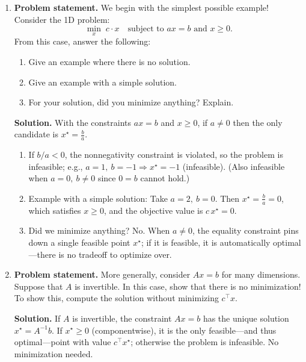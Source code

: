\documentclass[11pt]{article}
\begin{document}
	\begin{enumerate}[label=\textbf{1(\alph*)}]
		
		\item \textbf{Problem statement.}
		We begin with the simplest possible example! Consider the 1D problem:
		\begin{equation}
			\min_{x}\; c \cdot x
			\quad \text{subject to } a x = b \text{ and } x \ge 0.
			\label{eq:1d}
		\end{equation}
		From this case, answer the following:
		\begin{enumerate}[label=\roman*)]
			\item Give an example where there is no solution.
			\item Give an example with a simple solution.
			\item For your solution, did you minimize anything? Explain.
		\end{enumerate}
		
		\textbf{Solution.}
		With the constraints \(ax=b\) and \(x\ge 0\), if \(a\neq 0\) then the only candidate is
		\(x^\star=\tfrac{b}{a}\).
		\begin{enumerate}[label=\roman*)]
			\item If \(b/a<0\), the nonnegativity constraint is violated, so the problem is infeasible; e.g.,
			\(a=1,\ b=-1 \Rightarrow x^\star=-1\) (infeasible).
			(Also infeasible when \(a=0,\ b\neq 0\) since \(0=b\) cannot hold.)
			\item Example with a simple solution: Take \(a=2,\ b=0\). Then \(x^\star=\tfrac{b}{a}=0\), which satisfies \(x\ge 0\), and the objective value is \(c\,x^\star=0\).
			\item Did we minimize anything? No. When \(a\neq 0\), the equality constraint pins down a single feasible point \(x^\star\);
			if it is feasible, it is automatically optimal—there is no tradeoff to optimize over.
		\end{enumerate}
		
		\item \textbf{Problem statement.}
		More generally, consider $Ax = b$ for many dimensions. Suppose that $A$ is invertible. In this case, show that there is no minimization! To show this, compute the solution without minimizing $c^{\top}x$.
		
		\textbf{Solution.}
		If $A$ is invertible, the constraint $Ax=b$ has the unique solution $x^\star=A^{-1}b$. If $x^\star\ge 0$ (componentwise), it is the only feasible—and thus optimal—point with value $c^\top x^\star$; otherwise the problem is infeasible. No minimization needed.
		

\end{enumerate}
\end{document}
